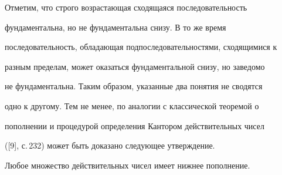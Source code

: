  


Отметим, что строго возрастающая сходящаяся последовательность 


фундаментальна, но не фундаментальна снизу. В то же время 


последовательность, обладающая подпоследовательностями, сходящимися к 


разным пределам, может оказаться фундаментальной снизу, но заведомо 


не фундаментальна. Таким образом, указанные два понятия не сводятся 


одно к другому. Тем не менее, по аналогии с классической теоремой о 


пополнении и процедурой определения Кантором действительных чисел 


([9], с.\,232) может быть доказано следующее утверждение. 


 


\begin{thm} 


Любое множество действительных чисел имеет нижнее пополнение. 


\end{thm} 


 


